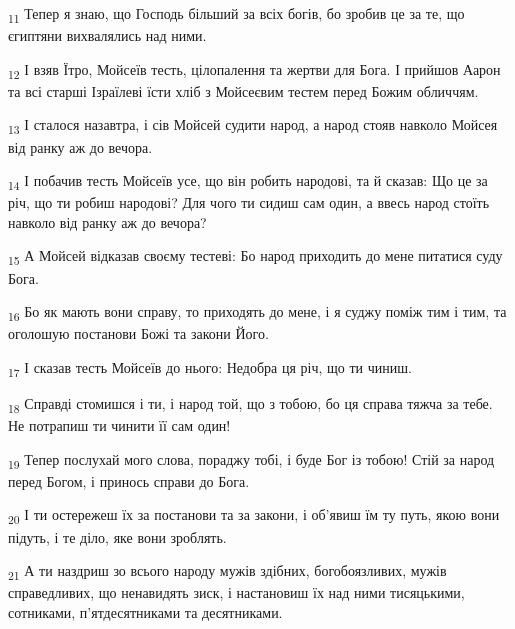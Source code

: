 \begin{tcolorbox}
\textsubscript{11} Тепер я знаю, що Господь більший за всіх богів, бо зробив це за те, що єгиптяни вихвалялись над ними.
\end{tcolorbox}
\begin{tcolorbox}
\textsubscript{12} І взяв Їтро, Мойсеїв тесть, цілопалення та жертви для Бога. І прийшов Аарон та всі старші Ізраїлеві їсти хліб з Мойсеєвим тестем перед Божим обличчям.
\end{tcolorbox}
\begin{tcolorbox}
\textsubscript{13} І сталося назавтра, і сів Мойсей судити народ, а народ стояв навколо Мойсея від ранку аж до вечора.
\end{tcolorbox}
\begin{tcolorbox}
\textsubscript{14} І побачив тесть Мойсеїв усе, що він робить народові, та й сказав: Що це за річ, що ти робиш народові? Для чого ти сидиш сам один, а ввесь народ стоїть навколо від ранку аж до вечора?
\end{tcolorbox}
\begin{tcolorbox}
\textsubscript{15} А Мойсей відказав своєму тестеві: Бо народ приходить до мене питатися суду Бога.
\end{tcolorbox}
\begin{tcolorbox}
\textsubscript{16} Бо як мають вони справу, то приходять до мене, і я суджу поміж тим і тим, та оголошую постанови Божі та закони Його.
\end{tcolorbox}
\begin{tcolorbox}
\textsubscript{17} І сказав тесть Мойсеїв до нього: Недобра ця річ, що ти чиниш.
\end{tcolorbox}
\begin{tcolorbox}
\textsubscript{18} Справді стомишся і ти, і народ той, що з тобою, бо ця справа тяжча за тебе. Не потрапиш ти чинити її сам один!
\end{tcolorbox}
\begin{tcolorbox}
\textsubscript{19} Тепер послухай мого слова, пораджу тобі, і буде Бог із тобою! Стій за народ перед Богом, і принось справи до Бога.
\end{tcolorbox}
\begin{tcolorbox}
\textsubscript{20} І ти остережеш їх за постанови та за закони, і об'явиш їм ту путь, якою вони підуть, і те діло, яке вони зроблять.
\end{tcolorbox}
\begin{tcolorbox}
\textsubscript{21} А ти наздриш зо всього народу мужів здібних, богобоязливих, мужів справедливих, що ненавидять зиск, і настановиш їх над ними тисяцькими, сотниками, п'ятдесятниками та десятниками.
\end{tcolorbox}
